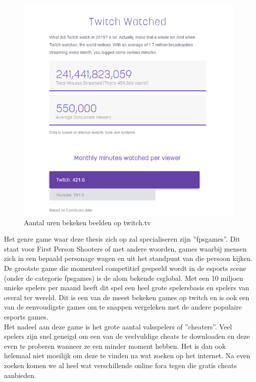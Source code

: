 \documentclass[pdftex,a4paper,12pt,twoside]{report}
\begin{document}
\begin{figure}[H]
\centering
\includegraphics[width=14cm]{img/TwitchInfographic}
\caption{Aantal uren bekeken beelden op \gls{twitch}.tv}
\end{figure}  


Het genre game waar deze thesis zich op zal specialiseren zijn ''\gls{fpsgames}''. Dit staat voor First Person Shooters of met andere woorden, games waarbij mensen zich in een bepaald personage wagen en uit het standpunt van die persoon kijken. De grootste game die momenteel competitief gespeeld wordt in de \gls{esports} scene (onder de categorie \gls{fpsgames}) is de alom bekende \gls{csglobal}. 
 Met een 10 miljoen unieke spelers per maand heeft dit spel een heel grote spelersbasis en spelers van overal ter wereld. Dit is een van de meest bekeken games op \gls{twitch} en is ook een van de eenvoudigste games om te snappen vergeleken met de andere populaire \gls{esports} games. \citep{csgoblog}
\\

Het nadeel aan deze game is het grote aantal valsspelers of ''\gls{cheat}ers''. Veel spelers zijn snel geneigd om een van de veelvuldige \gls{cheat}s te downloaden en deze even te proberen wanneer ze een minder moment hebben. Het is dan ook helemaal niet moeilijk om deze te vinden na wat zoeken op het internet. Na even zoeken komen we al heel wat verschillende online fora tegen die gratis \gls{cheat}s aanbieden.
\\
\end{document}
